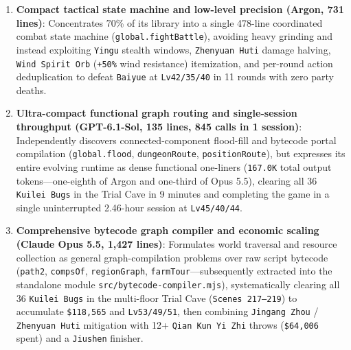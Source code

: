 \documentclass[11pt,a4paper]{article}
\begin{document}
\begin{enumerate}
\item \textbf{Compact tactical state machine and low-level precision (Argon, 731 lines)}: Concentrates 70\% of its library into a single 478-line coordinated combat state machine (\texttt{global\allowbreak{}.\allowbreak{}fightBat\allowbreak{}tle}), avoiding heavy grinding and instead exploiting \texttt{Yingu} stealth windows, \texttt{Zhenyuan\allowbreak{} \allowbreak{}Huti} damage halving, \texttt{Wind\allowbreak{} \allowbreak{}Spirit\allowbreak{} \allowbreak{}Orb} (\texttt{+50\%} wind resistance) itemization, and per-round action deduplication to defeat \texttt{Baiyue} at \texttt{Lv42\allowbreak{}/\allowbreak{}35\allowbreak{}/\allowbreak{}40} in 11 rounds with zero party deaths.
\item \textbf{Ultra-compact functional graph routing and single-session throughput (GPT-6.1-Sol, 135 lines, 845 calls in 1 session)}: Independently discovers connected-component flood-fill and bytecode portal compilation (\texttt{global\allowbreak{}.\allowbreak{}flood}, \texttt{dungeonR\allowbreak{}oute}, \texttt{position\allowbreak{}Route}), but expresses its entire evolving runtime as dense functional one-liners (\texttt{167\allowbreak{}.\allowbreak{}0K} total output tokens---one-eighth of Argon and one-third of Opus 5.5), clearing all 36 \texttt{Kuilei\allowbreak{} \allowbreak{}Bugs} in the Trial Cave in 9 minutes and completing the game in a single uninterrupted 2.46-hour session at \texttt{Lv45\allowbreak{}/\allowbreak{}40\allowbreak{}/\allowbreak{}44}.
\item \textbf{Comprehensive bytecode graph compiler and economic scaling (Claude Opus 5.5, 1,427 lines)}: Formulates world traversal and resource collection as general graph-compilation problems over raw script bytecode (\texttt{path2}, \texttt{compsOf}, \texttt{regionGr\allowbreak{}aph}, \texttt{farmTour}---subsequently extracted into the standalone module \texttt{src\allowbreak{}/\allowbreak{}bytecode\allowbreak{}-\allowbreak{}compiler\allowbreak{}.\allowbreak{}mjs}), systematically clearing all 36 \texttt{Kuilei\allowbreak{} \allowbreak{}Bugs} in the multi-floor Trial Cave (\texttt{Scenes\allowbreak{} \allowbreak{}217--219}) to accumulate \texttt{\$118\allowbreak{},\allowbreak{}565} and \texttt{Lv53\allowbreak{}/\allowbreak{}49\allowbreak{}/\allowbreak{}51}, then combining \texttt{Jingang\allowbreak{} \allowbreak{}Zhou} / \texttt{Zhenyuan\allowbreak{} \allowbreak{}Huti} mitigation with 12+ \texttt{Qian\allowbreak{} \allowbreak{}Kun\allowbreak{} \allowbreak{}Yi\allowbreak{} \allowbreak{}Zhi} throws (\texttt{\$64\allowbreak{},\allowbreak{}006} spent) and a \texttt{Jiushen} finisher.

\end{enumerate}
\end{document}
